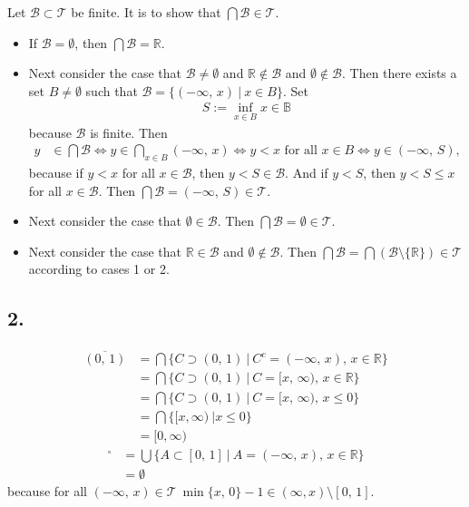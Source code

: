 \documentclass{article}
\begin{document}
Let $\mathcal{B} \subset \mathcal{T}$ be finite. It is to show that $\bigcap \mathcal{B} \in \mathcal{T}$.
\begin{itemize}
\item If $\mathcal{B} = \emptyset$, then $\bigcap \mathcal{B} = \mathbb{R}$.
\item Next consider the case that $\mathcal{B} \neq \emptyset$ and $\mathbb{R} \notin \mathcal{B}$ and $\emptyset \notin \mathcal{B}$.
    Then there exists a set $B \neq \emptyset$ such that $\mathcal{B} = \{(-\infty ,\, x) \ | \ x \in B\}.$
    Set 
    \begin{align*}
    S := \inf_{x \in B} x \in \mathbb{B}
    \end{align*}
    because $\mathcal{B}$ is finite.
    Then
    \begin{align*}
    y & \in \bigcap \mathcal{B}
        \Leftrightarrow y \in \bigcap_{x \in B} (-\infty ,\, x)
        \Leftrightarrow y < x \text{ for all } x \in B
        \Leftrightarrow y \in (-\infty ,\, S), 
    \end{align*}
    because if $y < x$ for all $x \in \mathcal{B}$, then $ y <  S \in \mathcal{B} $.
    And if $ y < S $, then $y < S \leq x$ for all $ x \in \mathcal{B} $.
    Then $\bigcap \mathcal{B} = (-\infty ,\, S) \in \mathcal{T}$.
  \item
    Next consider the case that $\emptyset \in \mathcal{B}$.
    Then $\bigcap \mathcal{B} = \emptyset \in \mathcal{T}$.
  \item
    Next consider the case that $\mathbb{R} \in \mathcal{B}$ and $\emptyset \notin \mathcal{B}$.
Then $\bigcap \mathcal{B} = \bigcap \left( \mathcal{B} \setminus \{ \mathbb{R} \} \right) \in \mathcal{T}$ according to cases 1 or 2.
\end{itemize}

\subsection*{2.}
\begin{align*}
  \overline{\left( 0 ,\, 1 \right)} & = \bigcap \{ C \supset (0,\,1) \ | \ C^{c} = (-\infty ,\, x) ,\, x \in \mathbb{R} \} \\
                                    & = \bigcap \{ C \supset (0 ,\, 1) \ | \ C = [x ,\, \infty) ,\, x \in \mathbb{R}\} \\
                                    & = \bigcap \{ C \supset (0 ,\, 1) \ | \ C = [x ,\, \infty) ,\, x \leq 0\} \\
                                    & = \bigcap \{ [x, \infty) \ | x \leq 0\} \\
  & = [0, \infty)
\end{align*}
\begin{align*}
  [0,\, 1]^{\circ} & = \bigcup \{ A \subset [0,\,1] \ | \ A = (-\infty ,\, x) ,\, x \in \mathbb{R}\} \\
  & = \emptyset
\end{align*}
because for all $(-\infty ,\, x) \in \mathcal{T} \ \min\{x ,\, 0\} - 1 \in (\infty, x) \setminus [0,\,1]$.
\end{document}
